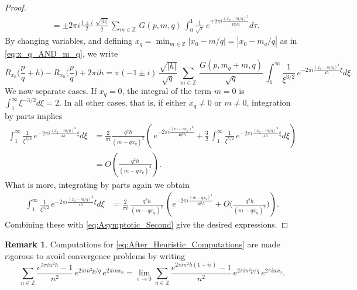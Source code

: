 \documentclass[11pt,reqno]{amsart}
\theoremstyle{definition}
\newtheorem{rem}[thm]{Remark}
\begin{document}
\begin{proof}
\begin{equation}
\begin{split}
& = \pm 2\pi i \frac{1\pm i}{2} \, \frac{\sqrt{|h|}}{q} \,\sum_{m \in \mathbb Z} \,  G(p,m,q) \,   \int_0^1 \frac{1}{\sqrt{\tau}} \, e^{ \mp 2\pi i \frac{(x_0 - m/q)^2}{4\tau |h|} } d\tau.
\end{split}
\end{equation}
By changing variables, and defining $x_q = \min_{m\in\mathbb Z} |x_0 - m/q| = |x_0 - m_q/q|$ as in \eqref{eq:x_q_AND_m_q}, we write
\begin{equation}\label{eq:Asymptotic_Second}
R_{x_0}\Big( \frac{p}{q} + h \Big) - R_{x_0}\Big( \frac{p}{q} \Big) + 2\pi i h  
= \pi  (-1 \pm i) \, \frac{\sqrt{|h|}}{\sqrt{q}} \,\sum_{m \in \mathbb Z} \, \frac{ G(p,m_q + m,q)}{\sqrt{q}} \,   \int_1^\infty \frac{1}{ \xi^{3/2}} \, e^{- 2\pi i \frac{(x_q - m/q)^2}{4 h} \xi} d\xi.
\end{equation}
We now separate cases.
If $x_q = 0$, the integral of the term $m = 0$ is $\int_1^\infty \xi^{-3/2}d\xi =2$.
In all other cases, that is, if either $x_q \neq 0$ or $m \neq 0$, integration by parts implies
\begin{equation}\label{eq:IntByPartsOnce}
\begin{split}
  \int_1^\infty \frac{1}{ \xi^{3/2}} \, e^{- 2\pi i \frac{(x_q - m/q)^2}{4 h} \xi} d\xi
 & = \frac{2}{\pi i}\frac{ q^2 h}{(m - qx_q)^2} \left( \, e^{- 2\pi i \frac{(m - qx_q)^2}{4 q^2 h}} + \frac{3}{2} \, \int_1^\infty \frac{1}{ \xi^{5/2}} \, e^{- 2\pi i \frac{(x_q - m/q)^2}{4 h} \xi} d\xi \right) \\
 &  = O\left( \frac{q^2 h}{(m-qx_q)^2} \right) .
  \end{split}
\end{equation}
What is more, integrating by parts again we obtain
\begin{equation}\label{eq:IntByPartsTwice}
\begin{split}
\int_1^\infty \frac{1}{ \xi^{3/2}} \, e^{- 2\pi i \frac{(x_q - m/q)^2}{4 h} \xi} d\xi
& = \frac{2}{\pi i} \, \frac{q^2 h}{ (m - qx_q)^2} \, \left(  e^{- 2\pi i \frac{(m - qx_q)^2}{4 q^2 h}} + O\Big( \frac{ q^2 h}{(m - qx_q)^2} \Big) \right).
\end{split}
\end{equation}
Combining these with \eqref{eq:Asymptotic_Second} give the desired expressions. 
\end{proof}
\begin{rem}
Computations for \eqref{eq:After_Heuristic_Computations} are made rigorous to avoid convergence problems by writing
\begin{equation}
\sum_{n \in \mathbb Z} \frac{e^{2\pi i n^2 h} - 1}{n^2}\, e^{2\pi i n^2 p/q} \, e^{2\pi i n x_0} = \lim_{\epsilon \to 0} \sum_{n \in \mathbb Z} \frac{e^{2\pi i n^2 h(1+i\epsilon)} - 1}{n^2}\, e^{2\pi i n^2 p/q} \, e^{2\pi i n x_0}.
\end{equation} 
\end{rem}
\end{document}
